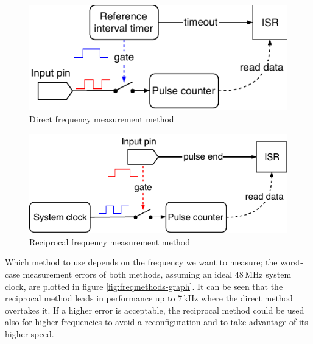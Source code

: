 \begin{figure}[h]
	\centering
	\includegraphics[scale=1] {img/fcap-direct.pdf}
	\caption{\label{fig:fcap-direct-dia}Direct frequency measurement method}
\end{figure}

\begin{figure}[h]
\centering
\includegraphics[scale=1] {img/fcap-reciprocal.pdf}
\caption{\label{fig:fcap-reci-dia}Reciprocal frequency measurement method}
\end{figure}

Which method to use depends on the frequency we want to measure; the worst-case measurement errors of both methods, assuming an ideal 48\,MHz system clock, are plotted in figure \ref{fig:freqmethods-graph}. It can be seen that the reciprocal method leads in performance up to 7\,kHz where the direct method overtakes it. If a higher error is acceptable, the reciprocal method could be used also for higher frequencies to avoid a reconfiguration and to take advantage of its higher speed.


